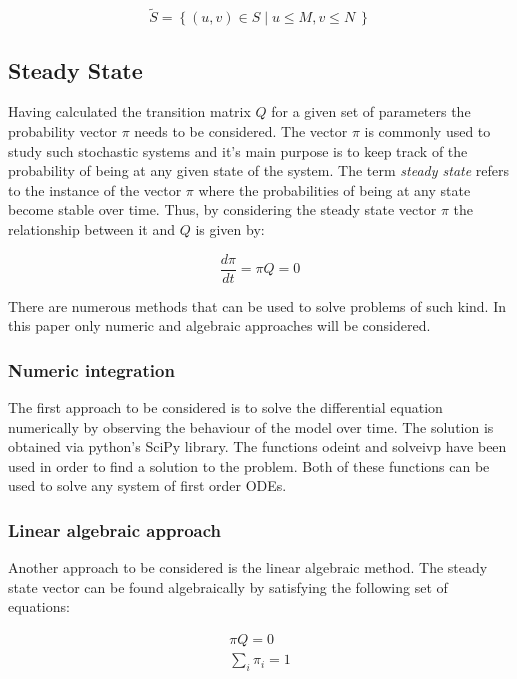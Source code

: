 \documentclass{article}
\begin{document}
\begin{equation}
    \tilde S = \left\{ (u, v) \in S \; | \; u \leq M, v\leq N\ \right\}
\end{equation}


\subsection{Steady State}
Having calculated the transition matrix $Q$ for a given set of parameters the probability vector $\pi$ needs to be considered. The vector $\pi$ is commonly used to study such stochastic systems and it's main purpose is to keep track of the probability of being at any given state of the system. The term \textit{steady state} refers to the instance of the vector $\pi$ where the probabilities of being at any state become stable over time. Thus, by considering the steady state vector $\pi$ the relationship between it and $Q$  is given by:

\begin{equation}
\frac{d\pi}{dt} = \pi Q = 0
\end{equation}

There are numerous methods that can be used to solve problems of such kind. In this paper only numeric and algebraic approaches will be considered. 

\subsubsection{Numeric integration}
The first approach to be considered is to solve the differential equation numerically by observing the behaviour of the model over time. The solution is obtained via python's SciPy library. The functions odeint and solve\textunderscore ivp have been used in order to find a solution to the problem. Both of these functions can be used to solve any system of first order ODEs.

\subsubsection{Linear algebraic approach}
Another approach to be considered is the linear algebraic method. The steady state vector can be found algebraically by satisfying the following set of equations:

\begin{align}
    \pi Q = 0 \\
    \sum_{i} \pi_i = 1
\end{align}
\end{document}
